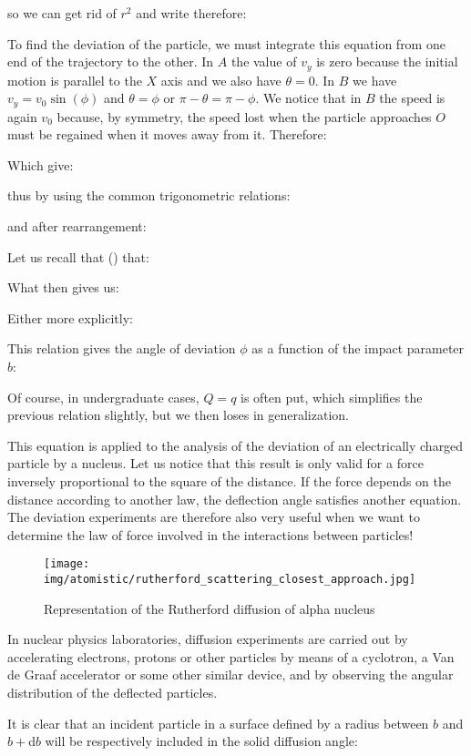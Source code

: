 	so we can get rid of $r^2$ and write therefore:
	
	To find the deviation of the particle, we must integrate this equation from one end of the trajectory to the other. In $A$ the value of $v_y$ is zero because the initial motion is parallel to the $X$ axis and we also have $\theta=0$. In $B$ we have $v_y=v_0\sin(\phi)$ and $\theta=\phi$ or $\pi-\theta=\pi-\phi$. We notice that in $B$ the speed is again $v_0$ because, by symmetry, the speed lost when the particle approaches $O$ must be regained when it moves away from it. Therefore:
	
	Which give:
	
	thus by using the common trigonometric relations:
	
	and after rearrangement:
	
	Let us recall that () that:
	
	What then gives us:
	
	Either more explicitly:
	
	This relation gives the angle of deviation $\phi$ as a function of the impact parameter $b$:
	
	Of course, in undergraduate cases, $Q = q$ is often put, which simplifies the previous relation slightly, but we then loses in generalization.
	
	This equation is applied to the analysis of the deviation of an electrically charged particle by a nucleus. Let us notice that this result is only valid for a force inversely proportional to the square of the distance. If the force depends on the distance according to another law, the deflection angle satisfies another equation. The deviation experiments are therefore also very useful when we want to determine the law of force involved in the interactions between particles!
	\begin{figure}[H]
		\centering
		\texttt{[image: img/atomistic/rutherford\_scattering\_closest\_approach.jpg]}
		\caption{Representation of the Rutherford diffusion of alpha nucleus}
	\end{figure}
	In nuclear physics laboratories, diffusion experiments are carried out by accelerating electrons, protons or other particles by means of a cyclotron, a Van de Graaf accelerator or some other similar device, and by observing the angular distribution of the deflected particles.

	It is clear that an incident particle in a surface defined by a radius between $b$ and $b + \mathrm{d}b$ will be respectively included in the solid diffusion angle:
	
